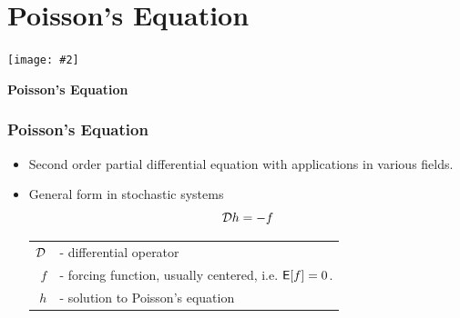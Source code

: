 \documentclass[xcolor=dvipsnames, subsection=false]{beamer}
\def\alertb#1{\alert{\color{BrickRed}  #1}}
\def\alertb#1{\alert{\color{BrickRed}  #1}}
\newcounter{temp}
\newenvironment{framesection}%
{\setcounter{temp}{\value{framenumber}}
\begin{frame}
\thispagestyle{empty}
}%
{\end{frame}\setcounter{framenumber}{\value{temp}}}
\def\Expect{{\sf E}}
\def\Ebox#1#2{%
	\begin{center}
		\texttt{[image: \#2]} %
	\end{center}}
\def\generate{{\cal D}}
\def\Expect{{\sf E}}
\begin{document}
\section{Poisson's Equation}

\begin{framesection}
	
	
	\Ebox{.6}{FishBanner.pdf}
	
	\vfill
	
	\centerline{\Large\bf Poisson's Equation}
	
\end{framesection}


\begin{frame}
\frametitle{Poisson's Equation}
\begin{itemize}
	\item Second order partial differential equation with applications in various fields.
	\item General form in stochastic systems
	{\LARGE
	\[
	\generate h =  -f
	\]
    }
	
	
	\begin{tabular}{rl}
$\generate$ & - differential operator\\
$f$ & - forcing function, usually centered, i.e. $\Expect[f] = 0$.\\ \pause
{\LARGE \alertb{$h$}} & {\LARGE \alertb{- solution to Poisson's equation}}
	\end{tabular}
\end{itemize}
\end{frame}
\end{document}
